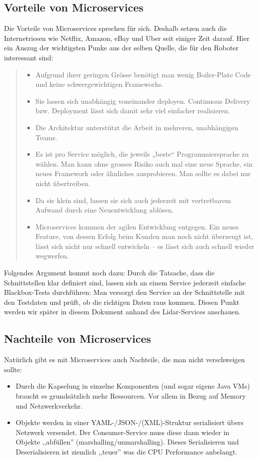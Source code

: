 \subsection{Vorteile von Microservices}
Die Vorteile von Microservices sprechen für sich. Deshalb setzen auch die Internetriesen wie Netflix, Amazon, eBay und Uber seit einiger Zeit darauf. Hier ein Auszug der wichtigsten Punke aus der selben Quelle\cite{informatik-aktuell-microservices}, die für den Roboter interessant sind:
\begin{quote}
	\begin{itemize}
		\item
		Aufgrund ihrer geringen Grösse benötigt man wenig Boiler-Plate Code und keine schwergewichtigen Frameworks.
		\item
		Sie lassen sich unabhängig voneinander deployen. Continuous Delivery bzw. Deployment lässt sich damit sehr viel einfacher realisieren.
		\item
		Die Architektur unterstützt die Arbeit in mehreren, unabhängigen Teams.
		\item
		Es ist pro Service möglich, die jeweils „beste“ Programmiersprache zu wählen. Man kann ohne grosses Risiko auch mal eine neue Sprache, ein neues Framework oder ähnliches ausprobieren. Man sollte es dabei nur nicht übertreiben.
		\item
		Da sie klein sind, lassen sie sich auch jederzeit mit vertretbarem Aufwand durch eine Neuentwicklung ablösen.
		\item
		Microservices kommen der agilen Entwicklung entgegen. Ein neues Feature, von dessen Erfolg beim Kunden man noch nicht überzeugt ist, lässt sich nicht nur schnell entwickeln – es lässt sich auch schnell wieder wegwerfen.
	\end{itemize}
\end{quote}

Folgendes Argument kommt noch dazu: Durch die Tatsache, dass die Schnittstellen klar definiert sind, lassen sich an einem Service jederzeit einfache Blackbox-Tests durchführen: Man versorgt den Service an der Schnittstelle mit den Testdaten und prüft, ob die richtigen Daten raus kommen. Diesen Punkt werden wir später in diesem Dokument anhand des Lidar-Services anschauen.
\subsection{Nachteile von Microservices}
Natürlich gibt es mit Microservices auch Nachteile, die man nicht verschweigen sollte:
\begin{itemize}
	\item
	Durch die Kapselung in einzelne Komponenten (und sogar eigene Java VMs) braucht es  grundsätzlich mehr Ressourcen. Vor allem in Bezug auf Memory und Netzwerkverkehr.
	\item
	Objekte werden in einer YAML-/JSON-/(XML)-Struktur serialisiert übers Netzwerk versendet. Der Consumer-Service muss diese dann wieder in Objekte ,,abfüllen'' (marshalling/unmarshalling). Dieses Serialisieren und Deserialisieren ist ziemlich ,,teuer'' was die CPU Performance anbelangt.
	
\end{itemize}


